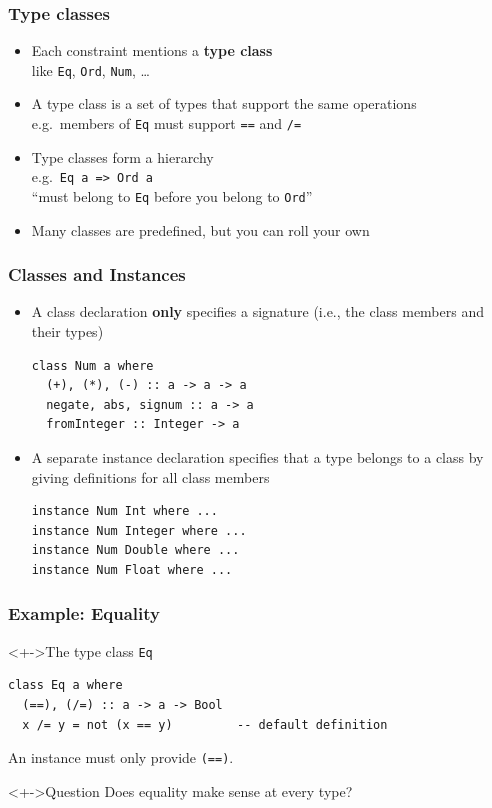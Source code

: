 \documentclass{beamer}
\begin{document}
\begin{frame}[fragile]
  \frametitle{Type classes}
  \begin{itemize}
  \item Each constraint mentions a \textbf{type class}\\
    like \texttt{Eq}, \texttt{Ord}, \texttt{Num}, \dots
  \item A type class is a set of types that support the same operations\\
    e.g.\ members of \texttt{Eq} must support \texttt{==} and \texttt{/=}
  \item Type classes form a hierarchy\\
    e.g.\ \texttt{Eq a => Ord a} \\``must belong to \lstinline{Eq}
    before you belong to \lstinline{Ord}''
  \item Many classes are predefined, but you can roll your own
  \end{itemize}
\end{frame}
\begin{frame}[fragile]
  \frametitle{Classes and Instances}
  \begin{itemize}
  \item A class declaration \textbf{only} specifies a signature (i.e., the class members and their types)
\begin{lstlisting}
class Num a where
  (+), (*), (-) :: a -> a -> a
  negate, abs, signum :: a -> a
  fromInteger :: Integer -> a
\end{lstlisting}
  \item A separate instance declaration specifies that a type belongs to a class by giving definitions for all class members
\begin{lstlisting}
instance Num Int where ...
instance Num Integer where ...
instance Num Double where ...
instance Num Float where ...
\end{lstlisting}
  \end{itemize}
\end{frame}
\begin{frame}[fragile]
  \frametitle{Example: Equality}
  \begin{block}<+->{The type class \texttt{Eq}}
\begin{lstlisting}
class Eq a where
  (==), (/=) :: a -> a -> Bool
  x /= y = not (x == y)         -- default definition
\end{lstlisting}
    An instance must only provide \texttt{(==)}.
  \end{block}
  \begin{alertblock}<+->{Question}
    Does equality make sense at every type?
  \end{alertblock}
\end{frame}
\end{document}
